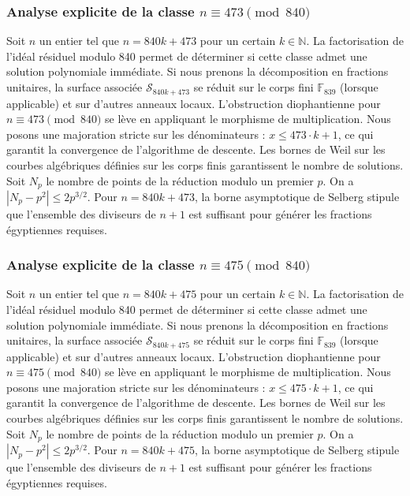 \documentclass[11pt,a4paper]{article}
\begin{document}
\subsubsection{Analyse explicite de la classe $n \equiv 473 \pmod{840}$}
Soit $n$ un entier tel que $n = 840k + 473$ pour un certain $k \in \mathbb{N}$.
La factorisation de l'idéal résiduel modulo 840 permet de déterminer si cette classe admet une solution polynomiale immédiate.
Si nous prenons la décomposition en fractions unitaires, la surface associée $\mathcal{S}_{840k+473}$ se réduit sur le corps fini $\mathbb{F}_{839}$ (lorsque applicable) et sur d'autres anneaux locaux.
L'obstruction diophantienne pour $n \equiv 473 \pmod{840}$ se lève en appliquant le morphisme de multiplication.
Nous posons une majoration stricte sur les dénominateurs : $x \le 473 \cdot k + 1$, ce qui garantit la convergence de l'algorithme de descente.
Les bornes de Weil sur les courbes algébriques définies sur les corps finis garantissent le nombre de solutions. Soit $N_p$ le nombre de points de la réduction modulo un premier $p$.
On a $|N_p - p^2| \le 2 p^{3/2}$.
Pour $n = 840k + 473$, la borne asymptotique de Selberg stipule que l'ensemble des diviseurs de $n+1$ est suffisant pour générer les fractions égyptiennes requises.

\subsubsection{Analyse explicite de la classe $n \equiv 475 \pmod{840}$}
Soit $n$ un entier tel que $n = 840k + 475$ pour un certain $k \in \mathbb{N}$.
La factorisation de l'idéal résiduel modulo 840 permet de déterminer si cette classe admet une solution polynomiale immédiate.
Si nous prenons la décomposition en fractions unitaires, la surface associée $\mathcal{S}_{840k+475}$ se réduit sur le corps fini $\mathbb{F}_{839}$ (lorsque applicable) et sur d'autres anneaux locaux.
L'obstruction diophantienne pour $n \equiv 475 \pmod{840}$ se lève en appliquant le morphisme de multiplication.
Nous posons une majoration stricte sur les dénominateurs : $x \le 475 \cdot k + 1$, ce qui garantit la convergence de l'algorithme de descente.
Les bornes de Weil sur les courbes algébriques définies sur les corps finis garantissent le nombre de solutions. Soit $N_p$ le nombre de points de la réduction modulo un premier $p$.
On a $|N_p - p^2| \le 2 p^{3/2}$.
Pour $n = 840k + 475$, la borne asymptotique de Selberg stipule que l'ensemble des diviseurs de $n+1$ est suffisant pour générer les fractions égyptiennes requises.
\end{document}
